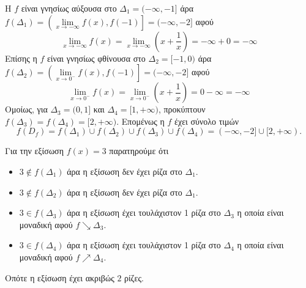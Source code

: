 \begin{alist}[start=3]
\item Η $f$ είναι γνησίως αύξουσα στο $\varDelta_1=(-\infty,-1]$ άρα $f(\varDelta_1)=\left(\lim\limits_{x\to-\infty}{f(x)},f(-1)\right]=(-\infty,-2]$ αφού
\[ \lim\limits_{x\to -\infty}{f(x)}=\lim\limits_{x\to-\infty}{\left(x+\frac{1}{x}\right)}=-\infty+0=-\infty \]
Επίσης η $f$ είναι γνησίως φθίνουσα στο $\varDelta_2=[-1,0)$ άρα $f(\varDelta_2)=\left(\lim\limits_{x\to0^-}{f(x)},f(-1)\right]=(-\infty,-2]$ αφού
\[ \lim\limits_{x\to0^-}{f(x)}=\lim\limits_{x\to0^-}{\left(x+\frac{1}{x}\right)}=0-\infty=-\infty \]
Ομοίως, για $\varDelta_3=(0,1]$ και $\varDelta_4=[1,+\infty)$, προκύπτουν $f(\varDelta_3)=f(\varDelta_4)=[2,+\infty)$. Επομένως η $f$ έχει σύνολο τιμών
\[f(D_f)=f(\varDelta_1)\cup f(\varDelta_2)\cup f(\varDelta_3)\cup f(\varDelta_4)=(-\infty,-2]\cup[2,+\infty).\]
\item Για την εξίσωση $f(x)=3$ παρατηρούμε ότι 
\begin{itemize}
\item $3\notin f(\varDelta_1)$ άρα η εξίσωση δεν έχει ρίζα στο $\varDelta_1$.
\item $3\notin f(\varDelta_2)$ άρα η εξίσωση δεν έχει ρίζα στο $\varDelta_1$.
\item $3\in f(\varDelta_3)$ άρα η εξίσωση έχει τουλάχιστον 1 ρίζα στο $\varDelta_3$ η οποία είναι μοναδική αφού $f\searrow\varDelta_3$.
\item $3\in f(\varDelta_4)$ άρα η εξίσωση έχει τουλάχιστον 1 ρίζα στο $\varDelta_4$ η οποία είναι μοναδική αφού $f\nearrow\varDelta_4$.
\end{itemize}
Οπότε η εξίσωση έχει ακριβώς $2$ ρίζες.
\end{alist}


